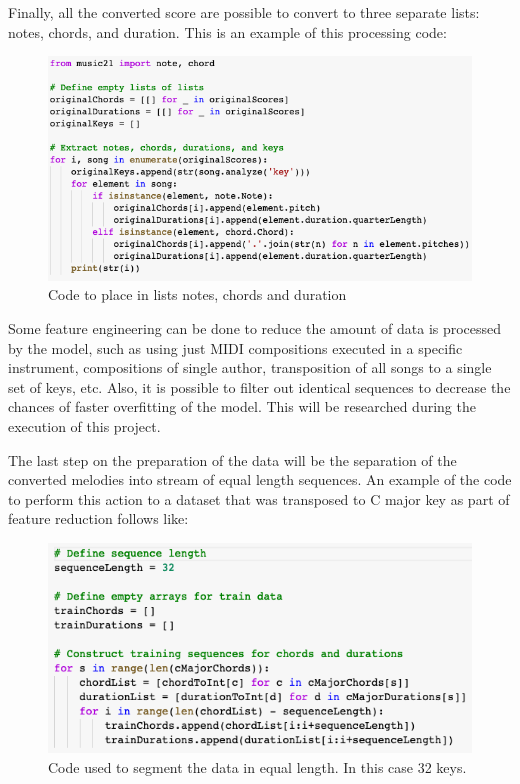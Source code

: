 Finally, all the converted score are possible to convert to three separate lists: notes,
chords, and duration. This is an example of this processing code:

\begin{figure}[h!]
  \includegraphics[width=\linewidth]{image/fig_JDF19.png}
  \caption{Code to place in lists notes, chords and duration }
\end{figure}


Some feature engineering can be done to reduce the amount of data is processed by the
model, such as using just MIDI compositions executed in a specific instrument,
compositions of single author, transposition of all songs to a single set of keys, etc.
Also, it is possible to filter out identical sequences to decrease the chances of faster
overfitting of the model. This will be researched during the execution of this project.

The last step on the preparation of the data will be the separation of the converted
melodies into stream of equal length sequences. An example of the code to perform this
action to a dataset that was transposed to C major key as part of feature reduction
follows like:

\begin{figure}[h!]
  \includegraphics[width=\linewidth]{image/fig_JDF20.png}
  \caption{Code used to segment the data in equal length. In this case 32 keys.}
\end{figure}

